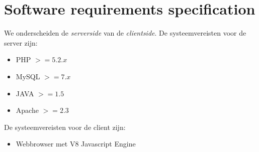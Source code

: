 \documentclass{article}
\begin{document}
\section{Software requirements specification}
We onderscheiden de \emph{serverside} van de \emph{clientside}.
De systeemvereisten voor de server zijn:
\begin{itemize}
	\item{PHP $>= 5.2.x$}
	\item{MySQL $>= 7.x$}
	\item{JAVA $>= 1.5$}
	\item{Apache $>= 2.3$}
\end{itemize}
De systeemvereisten voor de client zijn:
\begin{itemize}
	\item{Webbrowser met V8 Javascript Engine}
\end{itemize}
\end{document}
